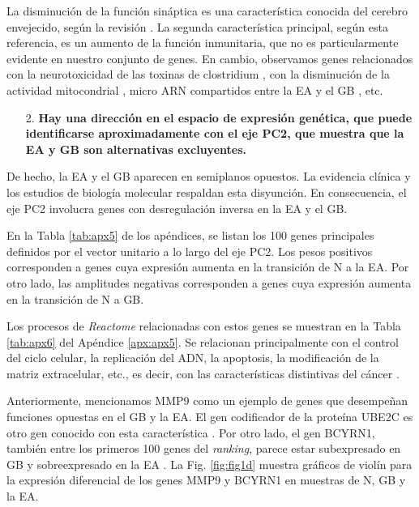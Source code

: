 La disminución de la función sináptica es una característica conocida del cerebro envejecido, según la revisión \cite{Ham_2020}. La segunda característica principal, según esta referencia, es un aumento de la función inmunitaria, que no es particularmente evidente en nuestro conjunto de genes. En cambio, observamos genes relacionados con la neurotoxicidad de las toxinas de clostridium \cite{Biazzo_2022}, con la disminución de la actividad mitocondrial \cite{Sun_2016}, micro ARN compartidos entre la EA y el GB \cite{Thomas_2020}, etc.

\begin{enumerate}
	\item[2.] \textbf{Hay una dirección en el espacio de expresión genética, que puede identificarse aproximadamente con el eje PC2, que muestra que la EA y GB son alternativas excluyentes.}
\end{enumerate}

De hecho, la EA y el GB aparecen en semiplanos opuestos. La evidencia clínica \cite{ou2012does, Driver_2012, Roe_2010, Musicco_2013} y los estudios de biología molecular \cite{Liu_2013, Lanni_2020} respaldan esta disyunción. En consecuencia, el eje PC2 involucra genes con desregulación inversa en la EA y el GB.

En la Tabla \ref{tab:apx5} de los apéndices, se listan los 100 genes principales definidos por el vector unitario a lo largo del eje PC2. Los pesos positivos corresponden a genes cuya expresión aumenta en la transición de N a la EA. Por otro lado, las amplitudes negativas corresponden a genes cuya expresión aumenta en la transición de N a GB.

Los procesos de \textit{Reactome} relacionadas con estos genes se muestran en la Tabla \ref{tab:apx6} del Apéndice \ref{apx:apx5}. Se relacionan principalmente con el control del ciclo celular, la replicación del ADN, la apoptosis, la modificación de la matriz extracelular, etc., es decir, con las características distintivas del cáncer \cite{Hanahan_2000, Hanahan_2011, Hanahan_2022}.

Anteriormente, mencionamos MMP9 como un ejemplo de genes que desempeñan funciones opuestas en el GB y la EA. El gen codificador de la proteína UBE2C es otro gen conocido con esta característica \cite{MA_2016, Jaladanki_2021}. Por otro lado, el gen BCYRN1, también entre los primeros 100 genes del \textit{ranking}, parece estar subexpresado en GB \cite{Mu2021} y sobreexpresado en la EA \cite{Zhang_2021}. La Fig. \ref{fig:fig1d} muestra gráficos de violín para la expresión diferencial de los genes MMP9 y BCYRN1 en muestras de N, GB y la EA.

